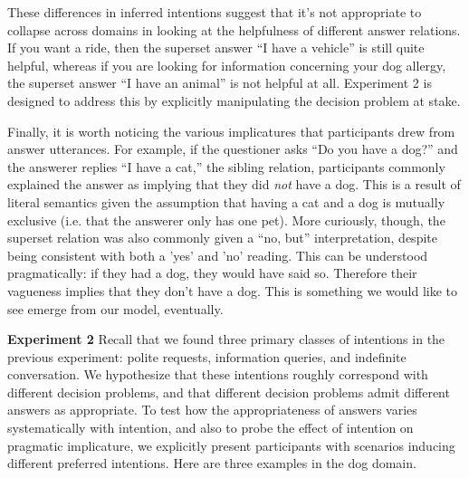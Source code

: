 \documentclass[12pt]{amsart}
\begin{document}
These differences in inferred intentions suggest that it's not appropriate to collapse across domains in looking at the helpfulness of different answer relations. If you want a ride, then the superset answer ``I have a vehicle'' is still quite helpful, whereas if you are looking for information concerning your dog allergy, the superset answer ``I have an animal'' is not helpful at all. Experiment 2 is designed to address this by explicitly manipulating the decision problem at stake.

Finally, it is worth noticing the various implicatures that participants drew from answer utterances. For example, if the questioner asks ``Do you have a dog?'' and the answerer replies ``I have a cat,'' the sibling relation, participants commonly explained the answer as implying that they did \emph{not} have a dog. This is a result of literal semantics given the assumption that having a cat and a dog is mutually exclusive (i.e. that the answerer only has one pet). More curiously, though, the superset relation was also commonly given a ``no, but'' interpretation, despite being consistent with both a 'yes' and 'no' reading. This can be understood pragmatically: if they had a dog, they would have said so. Therefore their vagueness implies that they don't have a dog. This is something we would like to see emerge from our model, eventually.

\textbf{Experiment 2} Recall that we found three primary classes of intentions in the previous experiment: polite requests, information queries, and indefinite conversation. We hypothesize that these intentions roughly correspond with different decision problems, and that different decision problems admit different answers as appropriate. To test how the appropriateness of answers varies systematically with intention, and also to probe the effect of intention on pragmatic implicature, we explicitly present participants with scenarios inducing different preferred intentions. Here are three examples in the dog domain. 
\end{document}

